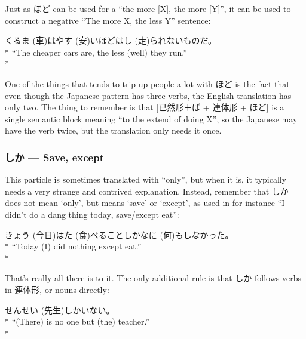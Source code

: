 \documentclass[11pt, b5paper, twoside, openright, onecolumn]{book}
\makeatletter
\newcommand*{\rubystack}[2]{{\relscale{0.5}%
  \begin{tabular}[b]{@{}c@{}}%
    {#1}\\%
   {\textscale{2}{#2}}%
  \end{tabular}}%
}
\DeclareRobustCommand*{\ruby}[2]{%
  \mbox{%
    \setlength{\parskip}{0ex}%
    \BeginAccSupp{method=pdfstringdef,ActualText={#1}}%
      \rubystack{\phantom{#2}}{#1}%
      \llap{%
        \rubystack{#2}{\phantom{#1}}%
      }%
    \EndAccSupp{}%
  }%
}
\renewcommand*{\ruby}[2]{#2 (#1)}%
\newenvironment{exampleblock}{
\setlength{\parindent}{0.6in}
\begin{minipage}[t]{\dimexpr\textwidth-\parindent}}
{\end{minipage}}
\makeatother
\begin{document}
Just as ほど can be used for a “the more [X]‚ the more [Y]”‚ it can be used to construct a negative “The more X‚ the less Y” sentence:

\vspace{0.4cm}
\begin{exampleblock}
\ruby{車}{くるま}は\ruby{安}{やす}いほど\ruby{走}{はし}られないものだ。 \\* 
“The cheaper cars are‚ the less (well) they run.” \\* 
\end{exampleblock}
\vspace{0.2cm}

One of the things that tends to trip up people a lot with ほど is the fact that even though the Japanese pattern has three verbs‚ the English translation has only two. The thing to remember is that [已然形＋ば + 連体形 + ほど] is a single semantic block meaning “to the extend of doing X”‚ so the Japanese may have the verb twice‚ but the translation only needs it once.

\subsubsection{しか — Save‚ except}

This particle is sometimes translated with “only”‚ but when it is‚ it typically needs a very strange and contrived explanation. Instead‚ remember that しか does not mean ‘only’‚ but means ‘save’ or ‘except’‚ as used in for instance “I didn’t do a dang thing today‚ save/except eat”:

\vspace{0.4cm}
\begin{exampleblock}
\ruby{今日}{きょう}は\ruby{食}{た}べることしか\ruby{何}{なに}もしなかった。 \\* 
“Today (I) did nothing except eat.” \\* 
\end{exampleblock}
\vspace{0.2cm}

That’s really all there is to it. The only additional rule is that しか follows verbs in 連体形‚ or nouns directly:

\vspace{0.4cm}
\begin{exampleblock}
\ruby{先生}{せんせい}しかいない。 \\* 
“(There) is no one but (the) teacher.” \\* 
\end{exampleblock}
\end{document}
